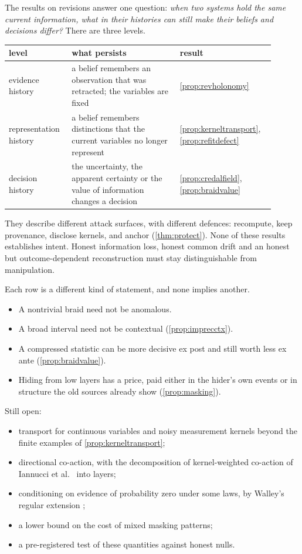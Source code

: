 \documentclass[11pt]{article}
\theoremstyle{definition}\newtheorem{definition}[theorem]{Definition}\newtheorem{remark}[theorem]{Remark}\newtheorem{example}[theorem]{Example}\newtheorem{problem}[theorem]{Open problem}\crefname{problem}{Problem}{Problems}
\begin{document}
The results on revisions answer one question: \emph{when two systems hold the same current information, what in their histories can still make their beliefs and decisions differ?} There are three levels.
\begin{center}\small
\begin{tabular}{>{\raggedright\arraybackslash}p{0.2\linewidth}>{\raggedright\arraybackslash}p{0.38\linewidth}>{\raggedright\arraybackslash}p{0.32\linewidth}}
level & what persists & result \\ \hline
evidence history & a belief remembers an observation that was retracted; the variables are fixed & \cref{prop:revholonomy} \\
representation history & a belief remembers distinctions that the current variables no longer represent & \cref{prop:kerneltransport}, \cref{prop:refitdefect} \\
decision history & the uncertainty, the apparent certainty or the value of information changes a decision & \cref{prop:credalfield}, \cref{prop:braidvalue} \\
\end{tabular}
\end{center}
They describe different attack surfaces, with different defences: recompute, keep provenance, disclose kernels, and anchor (\cref{thm:protect}). None of these results establishes intent. Honest information loss, honest common drift and an honest but outcome-dependent reconstruction must stay distinguishable from manipulation.

Each row is a different kind of statement, and none implies another.
\begin{itemize}
\item A nontrivial braid need not be anomalous.
\item A broad interval need not be contextual (\cref{prop:imprecctx}).
\item A compressed statistic can be more decisive ex post and still worth less ex ante (\cref{prop:braidvalue}).
\item Hiding from low layers has a price, paid either in the hider's own events or in structure the old sources already show (\cref{prop:masking}).
\end{itemize}
Still open:
\begin{itemize}
\item transport for continuous variables and noisy measurement kernels beyond the finite examples of \cref{prop:kerneltransport};
\item directional co-action, with the decomposition of kernel-weighted co-action of Iannucci et al.\ \cite{Iannucci2025} into layers;
\item conditioning on evidence of probability zero under some laws, by Walley's regular extension \cite{Walley1991};
\item a lower bound on the cost of mixed masking patterns;
\item a pre-registered test of these quantities against honest nulls.
\end{itemize}
\end{document}
